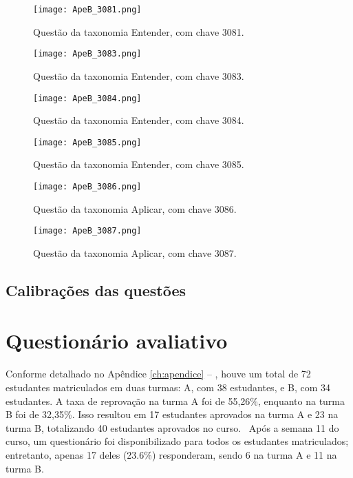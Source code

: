 \begin{figure}[!ht]
    \centering
    \texttt{[image: ApeB\_3081.png]}
     \caption{Questão da taxonomia Entender, com chave 3081.}
  \label{fig:ApeB_3081}
\end{figure}

\begin{figure}[!ht]
    \centering
    \texttt{[image: ApeB\_3083.png]}
     \caption{Questão da taxonomia Entender, com chave 3083.}
  \label{fig:ApeB_3083}
\end{figure}

\begin{figure}[!ht]
    \centering
    \texttt{[image: ApeB\_3084.png]}
     \caption{Questão da taxonomia Entender, com chave 3084.}
  \label{fig:ApeB_3084}
\end{figure}

\begin{figure}[!ht]
    \centering
    \texttt{[image: ApeB\_3085.png]}
     \caption{Questão da taxonomia Entender, com chave 3085.}
  \label{fig:ApeB_3085}
\end{figure}

\begin{figure}[!ht]
    \centering
    \texttt{[image: ApeB\_3086.png]}
     \caption{Questão da taxonomia Aplicar, com chave 3086.}
  \label{fig:ApeB_3086}
\end{figure}

\begin{figure}[!ht]
    \centering
    \texttt{[image: ApeB\_3087.png]}
     \caption{Questão da taxonomia Aplicar, com chave 3087.}
  \label{fig:ApeB_3087}
\end{figure}

\subsection{Calibrações das questões}\label{sec:calibracao}

\section{Questionário avaliativo}

Conforme detalhado no Apêndice \ref{ch:apendice} -- , houve um total de 72 estudantes matriculados em duas turmas: A, com 38 estudantes, e B, com 34 estudantes. A taxa de reprovação na turma A foi de 55,26\%, enquanto na turma B foi de 32,35\%. Isso resultou em 17 estudantes aprovados na turma A e 23 na turma B, totalizando 40 estudantes aprovados no curso.
\
Após a semana 11 do curso, um questionário foi disponibilizado para todos os estudantes matriculados; entretanto, apenas 17 deles (23.6\%) responderam, sendo 6 na turma A e 11 na turma B. 

